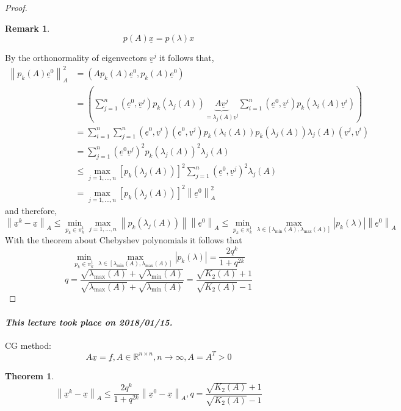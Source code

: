 \documentclass{article}
\newtheorem{theorem}{Theorem}
\newtheorem*{remark}{Remark}
\newcommand{\card}[1]{\left|#1\right|}
\newcommand{\norm}[1]{\left\|#1\right\|}
\newcommand{\dateref}[1]{\paragraph{\textit{This lecture took place on #1.}}}
\begin{document}
\begin{proof}
\begin{remark}
    \[ p(A) \underline x = p(\lambda) x \]
  \end{remark}
  By the orthonormality of eigenvectors $\underline v^j$ it follows that,
  \begin{align*}
    \norm{p_k(A) \underline e^0}_A^2
      &= (A p_k(A) \underline e^0, p_k(A) \underline e^0) \\
      &= \left( \sum_{j=1}^n (\underline e^0, \underline v^j) p_k(\lambda_j(A)) \underbrace{A \underline v^j}_{=\lambda_j(A) \underline v^j} \sum_{i=1}^n (\underline e^0, \underline v^i) p_k (\lambda_i(A) \underline v^i) \right) \\
      &= \sum_{i=1}^n \sum_{j=1}^n (\underline e^0, \underline v^i) (\underline e^0, \underline v^j) p_k(\lambda_i(A)) p_k(\lambda_j(A)) \lambda_j(A) (\underline v^j, \underline v^i) \\
      &= \sum_{j=1}^n (\underline e^0 \underline v^j)^2 p_k(\lambda_j(A))^2 \lambda_j(A) \\
      &\leq \max_{j=1,\ldots,n} \left[p_k(\lambda_j(A))\right]^2 \sum_{j=1}^n (\underline e^0, \underline v^j)^2 \lambda_j(A) \\
      &= \max_{j=1,\ldots,n} \left[p_k(\lambda_j(A))\right]^2 \norm{\underline e^0}_A^2
  \end{align*}
  and therefore,
  \[ \norm{\underline x^k - \underline x}_A \leq \min_{p_k \in \pi_k^1} \max_{j=1,\ldots,n} \norm{p_k(\lambda_j(A))} \norm{\underline e^0}_A \leq \min_{p_k \in \pi_k^1} \max_{\lambda \in [\lambda_{\text{min}}(A), \lambda_{\text{max}}(A)]} \card{p_k(\lambda)} \norm{\underline e^0}_A \]
  With the theorem about Chebyshev polynomials it follows that
  \[ \min_{p_k \in \pi_k^1} \max_{\lambda \in [\lambda_{\text{min}}(A), \lambda_{\text{max}}(A)]} \card{p_k(\lambda)} = \frac{2q^k}{1 + q^{2k}} \]
  \[ q = \frac{\sqrt{\lambda_{\text{max}}(A)} + \sqrt{\lambda_{\text{min}}(A)}}{\sqrt{\lambda_{\text{max}}(A)} + \sqrt{\lambda_{\text{min}}(A)}}
   = \frac{\sqrt{K_2(A)} + 1}{\sqrt{K_2(A)} - 1} \]
\end{proof}

\dateref{2018/01/15}

CG method:
\[ A \underline{x} = \underline{f}, A \in \mathbb R^{n \times n}, n \to \infty, A = A^T > 0 \]

\begin{theorem}
   \[ \norm{\underline x^k - \underline x}_A \leq \frac{2q^k}{1 + q^{2k}} \norm{\underline x^0 - \underline x}_A, q = \frac{\sqrt{K_2(A)} + 1}{\sqrt{K_2(A)} - 1} \]
\end{theorem}
\end{document}

